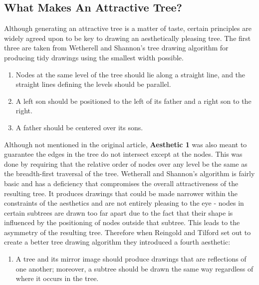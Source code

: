 \documentclass{report}
\begin{document}
\subsection{What Makes An Attractive Tree?}

Although generating an attractive tree is a matter of taste, certain principles are widely agreed upon to be key to drawing an aesthetically pleasing tree. The first three are taken from Wetherell and Shannon's tree drawing algorithm for producing tidy drawings using the smallest width possible\cite{tidierdrawingsws}.

\begin{enumerate}[leftmargin=*, align=left, label=\bfseries Aesthetic \arabic*:]
\item Nodes at the same level of the tree should lie along a straight line, and the straight lines defining the levels should be parallel. 

\item A left son should be positioned to the left of its father and a right son to the right.

\item A father should be centered over its sons.
\end{enumerate}

Although not mentioned in the original article, \textbf{Aesthetic 1} was also meant to guarantee the edges in the tree do not intersect except at the nodes. This was done by requiring that the relative order of nodes over any level be the same as the breadth-first traversal of the tree. Wetherall and Shannon's algorithm is fairly basic and has a deficiency that compromises the overall attractiveness of the resulting tree. It produces drawings that could be made narrower within the constraints of the aesthetics and are not entirely pleasing to the eye - nodes in certain subtrees are drawn too far apart due to the fact that their shape is influenced by the positioning of nodes outside that subtree. This leads to the asymmetry of the resulting tree. Therefore when Reingold and Tilford\cite{tidierdrawingsrt} set out to create a better tree drawing algorithm they introduced a fourth aesthetic:

\begin{enumerate}[leftmargin=*, align=left, label=\bfseries Aesthetic {4}:]
\item A tree and its mirror image should produce drawings that are reflections of one another; moreover, a subtree should be drawn the same way regardless of where it occurs in the tree.
\end{enumerate}
\end{document}
